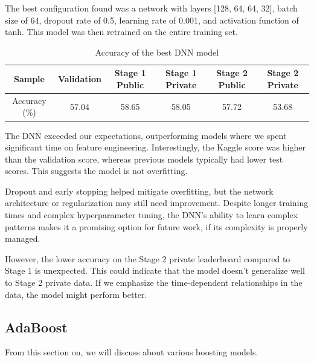 \documentclass[11pt,a4paper]{article}
\begin{document}
The best configuration found was a network with layers [128, 64, 64, 32], batch size of 64, dropout rate of 0.5, learning rate of 0.001, and activation function of tanh. This model was then retrained on the entire training set.

\begin{table}[H]
  \centering
  \begin{tabular}{|c|c|c|c|c|c|}
  \hline
  Sample & Validation & Stage 1 Public & Stage 1 Private & Stage 2 Public & Stage 2 Private \\ \hline
  Accuracy (\%) & 57.04 & 58.65 & 58.05 & 57.72 & 53.68 \\ \hline
  \end{tabular}
  \caption{Accuracy of the best DNN model}
\end{table}

The DNN exceeded our expectations, outperforming models where we spent significant time on feature engineering. Interestingly, the Kaggle score was higher than the validation score, whereas previous models typically had lower test scores. This suggests the model is not overfitting.

Dropout and early stopping helped mitigate overfitting, but the network architecture or regularization may still need improvement. Despite longer training times and complex hyperparameter tuning, the DNN's ability to learn complex patterns makes it a promising option for future work, if its complexity is properly managed.

However, the lower accuracy on the Stage 2 private leaderboard compared to Stage 1 is unexpected. This could indicate that the model doesn't generalize well to Stage 2 private data. If we emphasize the time-dependent relationships in the data, the model might perform better.





\subsection{AdaBoost}
From this section on, we will discuss about various boosting models.
\end{document}
